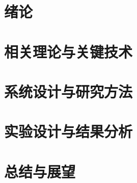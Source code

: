 \documentclass[12pt,a4paper,twoside,openright]{report}
\begin{document}
\makecover

\frontmatterpages

{}
\gxuIndentAfterTitle


\cleardoublepage
{}
{}
\gxuenglishtitle


\cleardoublepage
\tableofcontents

\mainmatterpages

\chapter{绪论}


\chapter{相关理论与关键技术}


\chapter{系统设计与研究方法}


\chapter{实验设计与结果分析}


\chapter{总结与展望}


\backmatterpages
\printthesisbibliography

\appendix
{}


\begin{acknowledgement}

\end{acknowledgement}

\makeendingpage
\end{document}
